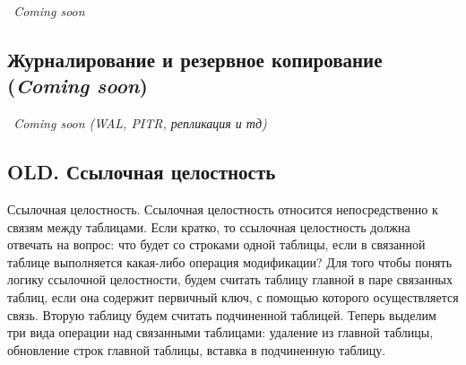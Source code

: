 \textit{~Coming soon}





\subsection{Журналирование и резервное копирование (\textit{Coming soon})}

\textit{~Coming soon (WAL, PITR, репликация и тд)}
























\subsection{OLD. Ссылочная целостность}

Ссылочная целостность. Ссылочная целостность относится непосредственно к связям между таблицами. Если кратко, то ссылочная целостность должна отвечать на вопрос: что будет со строками одной таблицы, если в связанной таблице выполняется какая-либо операция модификации? Для того чтобы понять логику ссылочной целостности, будем считать таблицу главной в паре связанных таблиц, если она содержит первичный ключ, с помощью которого осуществляется связь. Вторую таблицу будем считать подчиненной таблицей. Теперь выделим три вида операции над связанными таблицами: удаление из главной таблицы, обновление строк главной таблицы, вставка в подчиненную таблицу.


